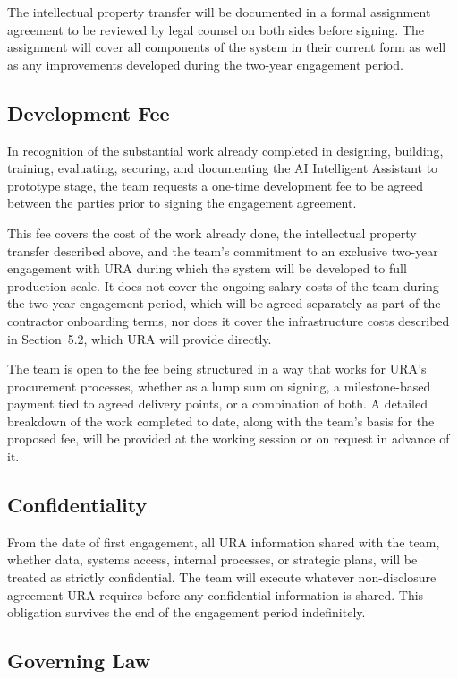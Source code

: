 \documentclass[11pt,a4paper]{article}
\begin{document}
The intellectual property transfer will be documented in a formal assignment agreement to be reviewed by legal counsel on both sides before signing. The assignment will cover all components of the system in their current form as well as any improvements developed during the two-year engagement period.

\subsection{Development Fee}

In recognition of the substantial work already completed in designing, building, training, evaluating, securing, and documenting the AI Intelligent Assistant to prototype stage, the team requests a one-time development fee to be agreed between the parties prior to signing the engagement agreement.

This fee covers the cost of the work already done, the intellectual property transfer described above, and the team's commitment to an exclusive two-year engagement with URA during which the system will be developed to full production scale. It does not cover the ongoing salary costs of the team during the two-year engagement period, which will be agreed separately as part of the contractor onboarding terms, nor does it cover the infrastructure costs described in Section~5.2, which URA will provide directly.

The team is open to the fee being structured in a way that works for URA's procurement processes, whether as a lump sum on signing, a milestone-based payment tied to agreed delivery points, or a combination of both. A detailed breakdown of the work completed to date, along with the team's basis for the proposed fee, will be provided at the working session or on request in advance of it.

\subsection{Confidentiality}

From the date of first engagement, all URA information shared with the team, whether data, systems access, internal processes, or strategic plans, will be treated as strictly confidential. The team will execute whatever non-disclosure agreement URA requires before any confidential information is shared. This obligation survives the end of the engagement period indefinitely.

\subsection{Governing Law}
\end{document}
